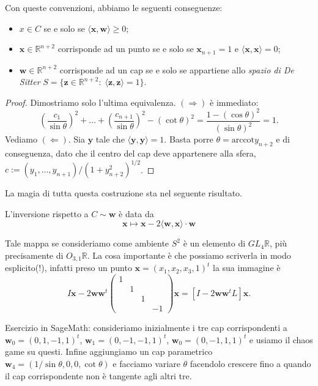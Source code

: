 Con queste convenzioni, abbiamo le seguenti conseguenze: 
\begin{itemize}
    \item $x\in C$ se e solo se $\langle \mathbf{x}, \mathbf{w}\rangle \geq0$;
    \item $\mathbf x\in\mathbb R^{n+2}$ corrisponde ad un punto se e solo se $\mathbf x_{n+1} = 1$ e $\langle\mathbf{x}, \mathbf{x}\rangle = 0$;
    \item $\mathbf{w}\in\mathbb R^{n+2}$ corrisponde ad un cap se e solo se appartiene allo \emph{spazio di De Sitter} $S= \{\mathbf z\in\mathbb R^{n+2}:\;\langle\mathbf{z}, \mathbf{z}\rangle = 1\}$.
\end{itemize}
\begin{proof}
    Dimostriamo solo l'ultima equivalenza. $(\Rightarrow)$ è immediato: 
    $$\left(\frac{c_1}{\sin\theta}\right)^2+\dots + \left(\frac{c_{n+1}}{\sin\theta}\right)^2 - (\cot\theta)^2 = \frac{1-(\cos\theta)^2}{(\sin\theta)^2} = 1.$$
    Vediamo $(\Leftarrow)$. Sia $\mathbf y$ tale che $\langle\mathbf{y}, \mathbf{y}\rangle = 1$. Basta porre $\theta = \text{arccot} y_{n+2}$ e di conseguenza, dato che il centro del cap deve appartenere alla sfera, $c:=(y_1,\dots,y_{n+1})/(1 + y_{n+2}^2)^{1/2}$.
\end{proof}

La magia di tutta questa costruzione sta nel seguente risultato. 
\begin{teorema}
L'inversione rispetto a $C\sim \mathbf w$ è data da 
$$\mathbf x\mapsto\mathbf x - 2\langle\mathbf{w}, \mathbf{x}\rangle\cdot\mathbf w$$
\end{teorema}

Tale mappa se consideriamo come ambiente $S^2$ è un elemento di $GL_4\mathbb R$, più precisamente di $O_{3,1} \mathbb R$. La cosa importante è che possiamo scriverla in modo esplicito(!), infatti preso un punto $\mathbf x = (x_1,x_2, x_3, 1)^t$ la sua immagine è 
$$I\mathbf x - 2 \mathbf w\mathbf w^t\begin{pmatrix}1 & & & \\ & 1 & & \\ & & 1 & \\ & & & -1\end{pmatrix}\mathbf x = [I - 2 \mathbf w\mathbf w^t L]\mathbf x.$$

Esercizio in SageMath: consideriamo inizialmente i tre cap corrispondenti a $\mathbf w_0 = (0, 1, -1, 1)^t$, $\mathbf w_1 = (0, -1, -1, 1)^t$, $\mathbf w_0 = (0, -1, 1, 1)^t$ e usiamo il chaos game su questi. Infine aggiungiamo un cap parametrico $\mathbf w_4 = (1/\sin\theta, 0, 0, \cot\theta)$ e facciamo variare $\theta$ facendolo crescere fino a quando il cap corrispondente non è tangente agli altri tre.  


